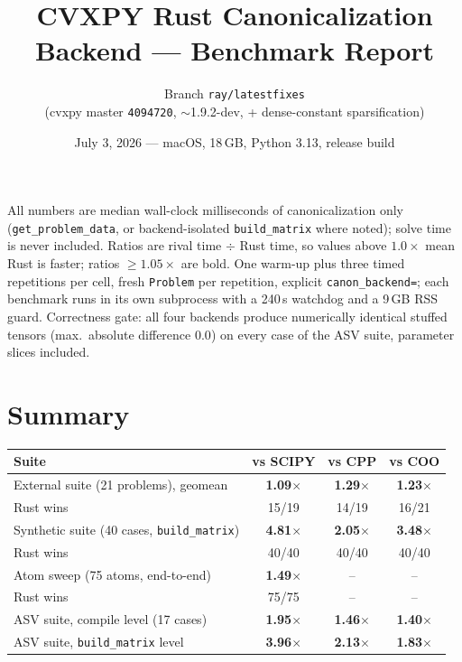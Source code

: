 \documentclass[11pt]{article}
\title{CVXPY Rust Canonicalization Backend --- Benchmark Report}
\author{Branch \texttt{ray/latestfixes} \\
  (cvxpy master \texttt{4094720}, $\sim$1.9.2-dev, + dense-constant sparsification)}
\date{July 3, 2026 --- macOS, 18\,GB, Python 3.13, release build}
\begin{document}
\maketitle

\begin{center}
\end{center}

\noindent All numbers are median wall-clock milliseconds of canonicalization only
(\texttt{get\_problem\_data}, or backend-isolated \texttt{build\_matrix} where noted);
solve time is never included. Ratios are rival time $\div$ Rust time, so values above
$1.0\times$ mean Rust is faster; ratios $\ge 1.05\times$ are bold. One warm-up plus three
timed repetitions per cell, fresh \texttt{Problem} per repetition, explicit
\texttt{canon\_backend=}; each benchmark runs in its own subprocess with a 240\,s watchdog
and a 9\,GB RSS guard. Correctness gate: all four backends produce numerically identical
stuffed tensors (max.\ absolute difference $0.0$) on every case of the ASV suite,
parameter slices included.

\section{Summary}
\begin{table}[h]\centering\small
\begin{tabular}{lccc}
\toprule
Suite & vs SCIPY & vs CPP & vs COO \\
\midrule
External suite (21 problems), geomean & \textbf{1.09$\times$} & \textbf{1.29$\times$} & \textbf{1.23$\times$} \\
\quad Rust wins & 15/19 & 14/19 & 16/21 \\
Synthetic suite (40 cases, \texttt{build\_matrix}) & \textbf{4.81$\times$} & \textbf{2.05$\times$} & \textbf{3.48$\times$} \\
\quad Rust wins & 40/40 & 40/40 & 40/40 \\
Atom sweep (75 atoms, end-to-end) & \textbf{1.49$\times$} & -- & -- \\
\quad Rust wins & 75/75 & -- & -- \\
ASV suite, compile level (17 cases) & \textbf{1.95$\times$} & \textbf{1.46$\times$} & \textbf{1.40$\times$} \\
ASV suite, \texttt{build\_matrix} level & \textbf{3.96$\times$} & \textbf{2.13$\times$} & \textbf{1.83$\times$} \\
\bottomrule
\end{tabular}
\end{table}
\end{document}
